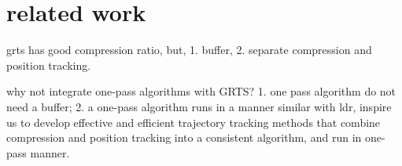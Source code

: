 
\section{related work}
\label{sec-related}


grts has good compression ratio, but, 1. buffer, 2. separate compression and position tracking.

why not integrate one-pass algorithms with GRTS? 
1. one pass algorithm do not need a buffer; 2. a one-pass algorithm runs in a manner similar with ldr, 
inspire us to develop effective and efficient trajectory tracking methods that combine compression and position tracking into a consistent algorithm, and run in one-pass manner. 




